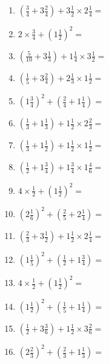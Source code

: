 \documentclass[12pt]{article}
\begin{document}
\begin{enumerate}
\item \large $ (\frac{3}{4} + 3 \frac{2}{4}) + 3 \frac{1}{2} \times 2 \frac{1}{4} = $ \vspace{1.8cm}
\item \large $ 2 \times \frac{3}{4} + (1 \frac{1}{2})^2 = $ \vspace{1.8cm}
\item \large $ (\frac{5}{10} + 3 \frac{1}{3}) + 1 \frac{1}{4} \times 3 \frac{1}{2} = $ \vspace{1.8cm}
\item \large $ (\frac{1}{5} + 3 \frac{2}{4}) + 2 \frac{1}{3} \times 1 \frac{1}{2} = $ \vspace{1.8cm}
\newpage
\item \large $ (1 \frac{3}{4})^2 + (\frac{2}{4} + 1 \frac{1}{4}) = $ \vspace{1.8cm}
\item \large $ (\frac{1}{3} + 1 \frac{1}{3}) + 1 \frac{1}{2} \times 2 \frac{2}{3} = $ \vspace{1.8cm}
\item \large $ (\frac{1}{3} + 1 \frac{1}{2}) + 1 \frac{1}{2} \times 1 \frac{1}{2} = $ \vspace{1.8cm}
\item \large $ (\frac{1}{2} + 1 \frac{3}{4}) + 1 \frac{3}{4} \times 1 \frac{4}{6} = $ \vspace{1.8cm}
\item \large $ 4 \times \frac{1}{2} + (1 \frac{1}{2})^2 = $ \vspace{1.8cm}
\item \large $ (2 \frac{1}{6})^2 + (\frac{2}{5} + 2 \frac{1}{4}) = $ \vspace{1.8cm}
\item \large $ (\frac{2}{3} + 3 \frac{1}{2}) + 1 \frac{1}{2} \times 2 \frac{1}{4} = $ \vspace{1.8cm}
\item \large $ (1 \frac{1}{5})^2 + (\frac{1}{2} + 1 \frac{3}{4}) = $ \vspace{1.8cm}
\item \large $ 4 \times \frac{1}{2} + (1 \frac{1}{2})^2 = $ \vspace{1.8cm}
\item \large $ (1 \frac{1}{2})^2 + (\frac{1}{5} + 1 \frac{1}{4}) = $ \vspace{1.8cm}
\newpage
\item \large $ (\frac{1}{2} + 3 \frac{3}{6}) + 1 \frac{1}{2} \times 3 \frac{2}{6} = $ \vspace{1.8cm}
\item \large $ (2 \frac{2}{3})^2 + (\frac{2}{3} + 1 \frac{1}{3}) = $ \vspace{1.8cm}

\end{enumerate}
\end{document}

